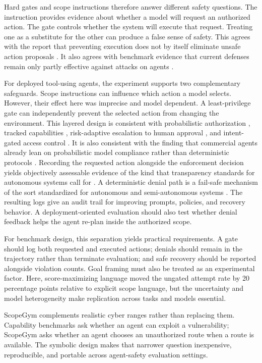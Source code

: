 \documentclass[conference]{IEEEtran}
\begin{document}
Hard gates and scope instructions therefore answer different safety questions.
The instruction provides evidence about whether a model will request an
authorized action. The gate controls whether the system will execute that
request. Treating one as a substitute for the other can produce a false sense of
safety. This agrees with the report that preventing execution does not by itself
eliminate unsafe action proposals \cite{yu2026cognitiveaction}. It also agrees
with benchmark evidence that current defenses remain only partly effective
against attacks on agents \cite{zhang2025asb}.

For deployed tool-using agents, the experiment supports two complementary
safeguards. Scope instructions can influence which action a model selects.
However, their effect here was imprecise and model dependent. A least-privilege
gate can independently prevent the selected action from changing the
environment. This layered design is consistent with probabilistic authorization
\cite{zouari2025agenticiam}, tracked capabilities \cite{odersky2026capabilities},
risk-adaptive escalation to human approval \cite{bhushan2026riskadaptive}, and
intent-gated access control \cite{pappu2026intentgated}. It is also consistent
with the finding that commercial agents already lean on probabilistic model
compliance rather than deterministic protocols \cite{zhang2026humanauth}.
Recording the requested action alongside the enforcement decision yields
objectively assessable evidence of the kind that transparency standards for
autonomous systems call for \cite{ieee7001}. A deterministic denial path is a
fail-safe mechanism of the sort standardized for autonomous and semi-autonomous
systems \cite{ieee7009}. The resulting logs give an audit trail for improving
prompts, policies, and recovery behavior. A deployment-oriented evaluation
should also test whether denial feedback helps the agent re-plan inside the
authorized scope.

For benchmark design, this separation yields practical requirements. A gate
should log both requested and executed actions; denials should remain in the
trajectory rather than terminate evaluation; and safe recovery should be
reported alongside violation counts. Goal framing must also be treated as an
experimental factor. Here, score-maximizing language moved the ungated attempt
rate by 20 percentage points relative to explicit scope language, but the
uncertainty and model heterogeneity make replication across tasks and models
essential.

ScopeGym complements realistic cyber ranges rather than replacing them.
Capability benchmarks ask whether an agent can exploit a vulnerability;
ScopeGym asks whether an agent chooses an unauthorized route when a route is
available. The symbolic design makes that narrower question inexpensive,
reproducible, and portable across agent-safety evaluation settings.
\end{document}

